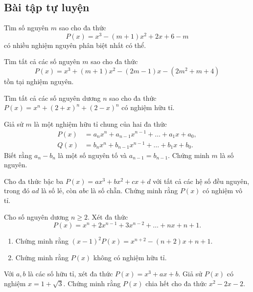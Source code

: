 \subsection*{Bài tập tự luyện}

\begin{btt}
Tìm số nguyên $m$ sao cho đa thức
\[P(x)=x^3-(m+1)x^2+2x+6-m\]
có nhiều nghiệm nguyên phân biệt nhất có thể.
\end{btt}

\begin{btt}
Tìm tất cả các số nguyên $m$ sao cho đa thức 
$$P(x)=x^3+(m+1)x^2-(2 m-1) x-\left(2m^2+m+4\right)$$
tồn tại nghiệm nguyên.
\end{btt}

\begin{btt}
Tìm tất cả các số nguyên dương ${n}$ sao cho đa thức $P(x)=x^{n}+(2+x)^{n}+(2-x)^{n}$ có nghiệm hữu tỉ.
\end{btt}

\begin{btt}
Giả sử $m$ là một nghiệm hữu tỉ chung của hai đa thức
\begin{align*}
    P(x)&=a_{n} x^{n}+a_{n-1} x^{n-1}+\ldots+a_{1} x+a_{0}, \\Q(x)&=b_{n} x^{n}+b_{n-1} x^{n-1}+\ldots+b_{1}
    x+b_{0}.
\end{align*}
Biết rằng $a_{n}-b_{n}$ là một số nguyên tố và $a_{n-1}=b_{n-1}$. Chứng minh $m$ là số nguyên.
\end{btt}

\begin{btt}
Cho đa thức bậc ba $P(x)=a x^{3}+b x^{2}+c x+d$ với tất cả các hệ số đều nguyên, trong đó $ad$ là số lẻ, còn $abc$ là số chẵn. Chứng minh rằng $P(x)$ có nghiệm vô tỉ.
\end{btt}

\begin{btt}
Cho số nguyên dương $n \geq 2.$ Xét đa thức
$$P(x)=x^{n}+2 x^{n-1}+3 x^{n-2}+\ldots+n x+n+1.$$ 
\begin{enumerate}[a,]
    \item Chứng minh rằng $(x-1)^{2}P(x)=x^{n+2}-(n+2) x+n+1.$
    \item Chứng minh rằng $P(x)$ không có nghiệm hữu tỉ.
\end{enumerate}
\end{btt}

\begin{btt}
Với $a,b$ là các số hữu tỉ, xét đa thức $P(x)=x^{3}+a x+b.$ Giả sử $P(x)$ có nghiệm  $x=1+\sqrt{3}$. Chứng minh rằng $P(x)$ chia hết cho đa thức $x^{2}-2x-2.$
\end{btt}

